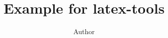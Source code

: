 \documentclass[twocolumn]{article}
\title{Example for latex-tools}
\author{Author}
\begin{document}
\maketitle













\renewcommand{\appendixpagename}{\huge Appendices}

\appendixpage


\end{document}
